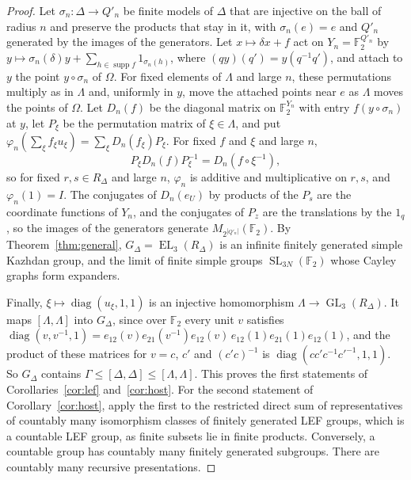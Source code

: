 \documentclass[11pt]{amsart}
\newcommand{\F}{\mathbb F}
\newcommand{\EL}{\operatorname{EL}}
\newcommand{\GL}{\operatorname{GL}}
\newcommand{\SL}{\operatorname{SL}}
\begin{document}
\begin{proof}
Let $\sigma_n\colon\Delta\to Q'_n$ be finite models of $\Delta$ that are
injective on the ball of radius $n$ and preserve the products that stay
in it, with $\sigma_n(e)=e$ and $Q'_n$ generated by the images of the
generators. Let $x\mapsto\delta x+f$ act on $Y_n=\F_2^{Q'_n}$ by
$y\mapsto\sigma_n(\delta)y+\sum_{h\in\operatorname{supp}f}1_{\sigma_n(h)}$,
where $(qy)(q')=y(q^{-1}q')$, and attach to $y$ the point $y\circ\sigma_n$
of $\Omega$. For fixed elements of $\Lambda$ and large $n$, these
permutations multiply as in $\Lambda$ and, uniformly in $y$, move the
attached points near $e$ as $\Lambda$ moves the points of $\Omega$. Let
$D_n(f)$ be the diagonal
matrix on $\F_2^{Y_n}$ with entry $f(y\circ\sigma_n)$ at $y$, let $P_\xi$ be
the permutation matrix of $\xi\in\Lambda$, and put
$\varphi_n(\sum_\xi f_\xi u_\xi)=\sum_\xi D_n(f_\xi)P_\xi$. For fixed $f$ and
$\xi$ and large $n$,
\[
  P_\xi D_n(f)P_\xi^{-1}=D_n(f\circ\xi^{-1}),
\]
so for fixed $r,s\in R_\Delta$ and large $n$, $\varphi_n$ is additive and
multiplicative on $r,s$, and $\varphi_n(1)=I$. The conjugates of
$D_n(e_U)$ by products of the $P_s$ are the coordinate functions of $Y_n$,
and the conjugates of $P_z$ are the translations by the $1_q$, so the
images of the generators generate $M_{2^{|Q'_n|}}(\F_2)$. By
Theorem~\ref{thm:general}, $G_\Delta=\EL_3(R_\Delta)$ is an infinite
finitely generated simple Kazhdan group, and the limit of finite simple
groups $\SL_{3N}(\F_2)$ whose Cayley graphs form expanders.

Finally, $\xi\mapsto\operatorname{diag}(u_\xi,1,1)$ is an injective
homomorphism $\Lambda\to\GL_3(R_\Delta)$. It maps $[\Lambda,\Lambda]$ into
$G_\Delta$, since over $\F_2$ every unit $v$ satisfies
$\operatorname{diag}(v,v^{-1},1)=e_{12}(v)e_{21}(v^{-1})e_{12}(v)\,e_{12}(1)e_{21}(1)e_{12}(1)$,
and the product of these matrices for $v=c$, $c'$ and $(c'c)^{-1}$ is
$\operatorname{diag}(cc'c^{-1}c'^{-1},1,1)$. So $G_\Delta$ contains
$\Gamma\le[\Delta,\Delta]\le[\Lambda,\Lambda]$. This proves the first
statements of Corollaries~\ref{cor:lef} and~\ref{cor:host}. For the second
statement of Corollary~\ref{cor:host}, apply the first to the
restricted direct sum of representatives of countably many isomorphism
classes of finitely generated LEF groups, which is a countable LEF group,
as finite subsets lie in finite products. Conversely, a countable group
has countably many finitely generated subgroups. There are countably many
recursive presentations.


\end{proof}
\end{document}
